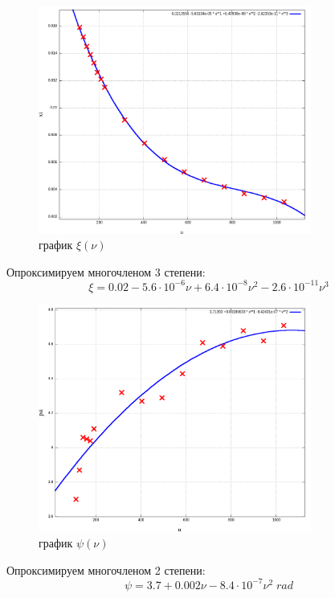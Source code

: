\documentclass{article}
\begin{document}
\begin{figure}[H]
    \centering
    \includegraphics[width=0.8\textwidth]{2.png}
    \caption{график \( \xi(\nu) \)}
\end{figure}

Опроксимируем многочленом 3 степени:
\[ \xi = 0.02 - 5.6\cdot 10^{-6}\nu + 6.4\cdot 10^{-8}\nu^2 - 2.6\cdot 10^{-11}\nu^3 \]

\begin{figure}[H]
    \centering
    \includegraphics[width=0.8\textwidth]{3.png}
    \caption{график \( \psi(\nu) \)}
\end{figure}

Опроксимируем многочленом 2 степени:
\[ \psi = 3.7 + 0.002\nu -8.4\cdot 10^{-7}\nu^2\; rad \]
\end{document}
